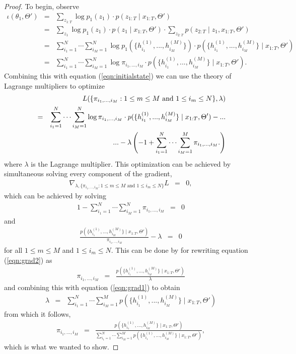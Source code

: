 \documentclass{amsart}
\begin{document}
\begin{proof}
To begin, observe 
\begin{eqnarray*}
\iota(\theta_1,\Theta') &=& \sum_{z_{1:T}}\log p_1(z_1)\cdot p(z_{1:T}\mid x_{1:T},\Theta')\\
& = & \sum_{z_1}\log p_1(z_1)\cdot p(z_1\mid x_{1:T},\Theta')\cdot \sum_{z_{2:T}}p(z_{2:T}\mid z_1,x_{1:T},\Theta')\\
& = & \sum_{i_1=1}^N\cdots \sum_{i_M=1}^N\log p_1(\{h_{i_1}^{(1)},...,h_{i_M}^{(M)}\})\cdot p(\{h_{i_1}^{(1)},...,h_{i_M}^{(M)}\}\mid x_{1:T},\Theta')\\
& = & \sum_{i_1=1}^N\cdots \sum_{i_M=1}^N\log \pi_{{i_1},...,{i_M}}\cdot p(\{h_{i_1}^{(1)},...,h_{i_M}^{(M)}\}\mid x_{1:T},\Theta').
\end{eqnarray*}
Combining this with equation (\ref{eqn:initialstate}) we can use the theory of Lagrange multipliers to optimize 
\begin{eqnarray*}
&&L(\{\pi_{{i_1},...,{i_M}}:1\leq m\leq M\text{ and }1\leq i_m\leq N\}, \lambda) \\
& = & \sum_{i_1=1}^N\cdots \sum_{i_M=1}^N\log \pi_{{i_1},...,{i_M}}\cdot p(\{h_{i_1}^{(1)},...,h_{i_M}^{(M)}\}\mid x_{1:T},\Theta') -...\\
&&\hspace{10mm}...- \lambda \left(-1 + \sum_{i_1=1}^N\cdots \sum_{i_M=1}^M \pi_{i_1,...,i_M}.\right) 
\end{eqnarray*}
where $\lambda$ is the Lagrange multiplier.  This optimization can be achieved by simultaneous solving every component of the gradient, 
\begin{eqnarray*}
\nabla_{\lambda,\{\pi_{{i_1},...,{i_M}}:1\leq m\leq M \text{ and } 1\leq i_m\leq N\}}L &=& 0,
\end{eqnarray*}
which can be achieved by solving 
\begin{eqnarray}\label{eqn:grad1}
1 - \sum_{i_1=1}^N\cdots \sum_{i_M=1}^N \pi_{i_1,...,i_M} &=& 0
\end{eqnarray}
and 
\begin{eqnarray}\label{eqn:grad2}
\frac{p(\{h_{i_1}^{(1)},...,h_{i_M}^{(M)}\}\mid x_{1:T},\Theta')}{\pi_{{i_1},...,{i_M}}} - \lambda &=& 0
\end{eqnarray}
for all $1\leq m\leq M$ and $1\leq i_m\leq N$.  This can be done by for rewriting equation (\ref{eqn:grad2}) as 
\begin{eqnarray*}
 \pi_{{i_1},...,{i_M}}&=&\frac{p(\{h_{i_1}^{(1)},...,h_{i_M}^{(M)}\}\mid x_{1:T},\Theta')}{\lambda}
\end{eqnarray*}
and combining this with equation (\ref{eqn:grad1}) to obtain 
\begin{eqnarray*}
\lambda&=&\sum_{i_1=1}^N\cdots \sum_{i_M=1}^M p(\{h_{i_1}^{(1)},...,h_{i_M}^{(M)}\}\mid x_{1:T},\Theta')
\end{eqnarray*}
from which it follows,
\begin{eqnarray*}
\pi_{{i_1},...,{i_M}}&=&\frac{p(\{h_{i_1}^{(1)},...,h_{i_M}^{(M)}\}\mid x_{1:T},\Theta')}{\sum_{i_1=1}^N\cdots \sum_{i_M=1}^M p(\{h_{i_1}^{(1)},...,h_{i_M}^{(M)}\}\mid x_{1:T},\Theta')},
\end{eqnarray*}
which is what we wanted to show.
\end{proof}
\end{document}
